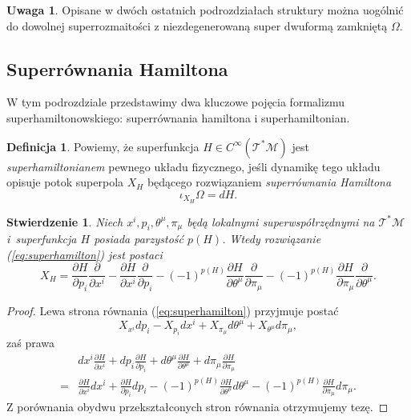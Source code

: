 \documentclass[11pt,a4paper]{report}
\newtheorem{proposition}[theorem]{Stwierdzenie}
\theoremstyle{definition}
\newtheorem{definition}[theorem]{Definicja}
\newtheorem{remark}[theorem]{Uwaga}
\begin{document}
\begin{remark}
 Opisane w dwóch ostatnich podrozdziałach struktury można uogólnić do dowolnej superrozmaitości z niezdegenerowaną super dwuformą zamkniętą $\Omega$.
\end{remark}

\subsection{Superrównania Hamiltona}

W tym podrozdziale przedstawimy dwa kluczowe pojęcia formalizmu superhamiltonowskiego: superrównania hamiltona i superhamiltonian.

\begin{definition}
 Powiemy, że superfunkcja $H \in C^\infty(\mathcal{T^*M})$ jest \textit{superhamiltonianem} pewnego układu fizycznego, jeśli dynamikę tego układu opisuje potok superpola $X_H$ będącego rozwiązaniem \textit{superrównania Hamiltona}
 \begin{equation}
 \label{eq:superhamilton}
  \iota_{X_H} \Omega = dH.
 \end{equation}
\end{definition}

\begin{proposition}
 Niech $x^i, p_i, \theta^\mu, \pi_\mu$ będą lokalnymi superwspółrzędnymi na $\mathcal{T^*M}$ i~superfunkcja $H$ posiada parzystość $p(H)$. Wtedy rozwiązanie (\ref{eq:superhamilton}) jest postaci
 \begin{equation*}
  X_H = \frac{\partial H}{\partial p_i} \frac{\partial}{\partial x^i} 
        - \frac{\partial H}{\partial x^i} \frac{\partial}{\partial p_i}
        -(-1)^{p(H)} \frac{\partial H}{\partial \theta^\mu} \frac{\partial}{\partial \pi_\mu}
        -(-1)^{p(H)} \frac{\partial H}{\partial \pi_\mu} \frac{\partial}{\partial \theta^\mu}.
 \end{equation*}
\end{proposition}

\begin{proof}
 Lewa strona równania (\ref{eq:superhamilton}) przyjmuje postać 
 \begin{equation*}
  X_{x^i} dp_i - X_{p_i} dx^i + X_{\pi_\mu} d\theta^\mu + X_{\theta^\mu} d\pi_\mu,
 \end{equation*}
 zaś prawa
 \begin{equation*}
 \begin{aligned}
  &dx^i \frac{\partial H}{\partial x^i} + dp_i \frac{\partial H}{\partial p_i} + d\theta^\mu \frac{\partial H}{\partial \theta^\mu} + d\pi_\mu \frac{\partial H}{\partial \pi_\mu} \\
  =& \frac{\partial H}{\partial x^i} dx^i
  + \frac{\partial H}{\partial p_i} dp_i
  -(-1)^{p(H)} \frac{\partial H}{\partial \theta^\mu} d\theta^\mu
  -(-1)^{p(H)} \frac{\partial H}{\partial \pi_\mu} d\pi_\mu.
 \end{aligned}
 \end{equation*}
 Z porównania obydwu przekształconych stron równania otrzymujemy tezę.
\end{proof}
\end{document}

